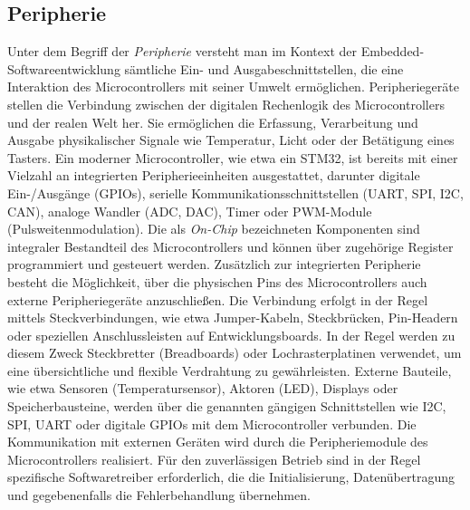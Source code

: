 \subsection{Peripherie}
Unter dem Begriff der \emph{Peripherie} versteht man im Kontext der Embedded-Softwareentwicklung sämtliche Ein- und Ausgabeschnittstellen, die eine Interaktion des Microcontrollers mit seiner Umwelt ermöglichen.
Peripheriegeräte stellen die Verbindung zwischen der digitalen Rechenlogik des Microcontrollers und der realen Welt her.
Sie ermöglichen die Erfassung, Verarbeitung und Ausgabe physikalischer Signale wie Temperatur, Licht oder der Betätigung eines Tasters.
Ein moderner Microcontroller, wie etwa ein STM32, ist bereits mit einer Vielzahl an integrierten Peripherieeinheiten ausgestattet, darunter digitale Ein-/Ausgänge (GPIOs), serielle Kommunikationsschnittstellen (UART, SPI, I2C, CAN), analoge Wandler (ADC, DAC), Timer oder PWM-Module (Pulsweitenmodulation). 
Die als \emph{On-Chip} bezeichneten Komponenten sind integraler Bestandteil des Microcontrollers und können über zugehörige Register programmiert und gesteuert werden.
Zusätzlich zur integrierten Peripherie besteht die Möglichkeit, über die physischen Pins des Microcontrollers auch externe Peripheriegeräte anzuschließen. 
Die Verbindung erfolgt in der Regel mittels Steckverbindungen, wie etwa Jumper-Kabeln, Steckbrücken, Pin-Headern oder speziellen Anschlussleisten auf Entwicklungsboards. 
In der Regel werden zu diesem Zweck Steckbretter (Breadboards) oder Lochrasterplatinen verwendet, um eine übersichtliche und flexible Verdrahtung zu gewährleisten. 
Externe Bauteile, wie etwa Sensoren (Temperatursensor), Aktoren (LED), Displays oder Speicherbausteine, werden über die genannten gängigen Schnittstellen wie I2C, SPI, UART oder digitale GPIOs mit dem Microcontroller verbunden.
Die Kommunikation mit externen Geräten wird durch die Peripheriemodule des Microcontrollers realisiert. 
Für den zuverlässigen Betrieb sind in der Regel spezifische Softwaretreiber erforderlich, die die Initialisierung, Datenübertragung und gegebenenfalls die Fehlerbehandlung übernehmen.

